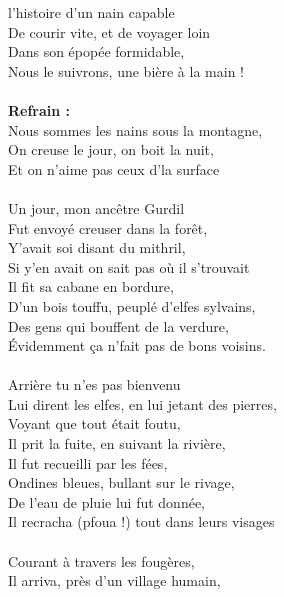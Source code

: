 
 l'histoire d'un nain capable
\\De courir vite, et de voyager loin
\\Dans son épopée formidable,
\\Nous le suivrons, une bière à la main !
\\\\\textbf{Refrain :}
\\Nous sommes les nains sous la montagne,
\\On creuse le jour, on boit la nuit,
\\Et on n'aime pas ceux d'la surface
\\\\Un jour, mon ancêtre Gurdil 
\\Fut envoyé creuser dans la forêt,
\\Y'avait soi disant du mithril,
\\Si y'en avait on sait pas où il s'trouvait
\\Il fit sa cabane en bordure,
\\D'un bois touffu, peuplé d'elfes sylvains,
\\Des gens qui bouffent de la verdure,
\\Évidemment ça n'fait pas de bons voisins.
\\\\Arrière tu n'es pas bienvenu
\\Lui dirent les elfes, en lui jetant des pierres,
\\Voyant que tout était foutu,
\\Il prit la fuite, en suivant la rivière,
\\Il fut recueilli par les fées,
\\Ondines bleues, bullant sur le rivage,
\\De l'eau de pluie lui fut donnée,
\\Il recracha (pfoua !) tout dans leurs visages
\breakpage
\\\\Courant à travers les fougères,
\\Il arriva, près d'un village humain,

